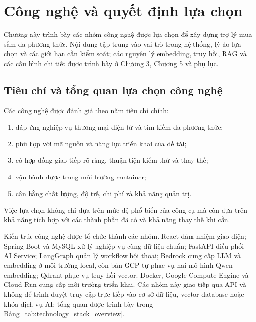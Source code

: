 \section{Công nghệ và quyết định lựa chọn}

Chương này trình bày các nhóm công nghệ được lựa chọn để xây dựng trợ lý mua sắm
đa phương thức. Nội dung tập trung vào vai trò trong hệ thống, lý do lựa chọn và
các giới hạn cần kiểm soát; các nguyên lý embedding, truy hồi, RAG và các cấu hình
chi tiết được trình bày ở Chương 3, Chương 5 và phụ lục.

\subsection{Tiêu chí và tổng quan lựa chọn công nghệ}

Các công nghệ được đánh giá theo năm tiêu chí chính:
\begin{enumerate}[label=\arabic*., leftmargin=1.15cm]
    \item đáp ứng nghiệp vụ thương mại điện tử và tìm kiếm đa phương thức;
    \item phù hợp với mã nguồn và năng lực triển khai của đề tài;
    \item có hợp đồng giao tiếp rõ ràng, thuận tiện kiểm thử và thay thế;
    \item vận hành được trong môi trường container;
    \item cân bằng chất lượng, độ trễ, chi phí và khả năng quản trị.
\end{enumerate}

Việc lựa chọn không chỉ dựa trên mức độ phổ biến của công cụ mà còn dựa trên khả
năng tích hợp với các thành phần đã có và khả năng thay thế khi cần.

Kiến trúc công nghệ được tổ chức thành các nhóm. React đảm nhiệm giao diện; Spring
Boot và MySQL xử lý nghiệp vụ cùng dữ liệu chuẩn; FastAPI điều phối AI Service;
LangGraph quản lý workflow hội thoại; Bedrock cung cấp LLM và embedding ở môi
trường local, còn bản GCP tự phục vụ hai mô hình Qwen embedding; Qdrant phục vụ
truy hồi vector. Docker, Google Compute Engine và Cloud Run cung cấp môi trường
triển khai. Các nhóm này giao tiếp qua API và không để trình duyệt truy cập trực
tiếp vào cơ sở dữ liệu, vector database hoặc khóa dịch vụ AI; tổng quan được trình
bày trong Bảng~\ref{tab:technology_stack_overview}.

